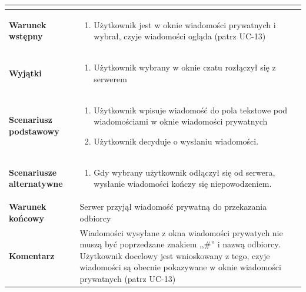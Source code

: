 \documentclass[11pt,oneside,a4paper,titlepage,onecolumn]{article}
\newenvironment{enumreq}
{ \begin{enumerate}[topsep=0pt,itemsep=-1ex,partopsep=1ex,parsep=1ex] }
{ \end{enumerate}                  }
\begin{document}
{\begin{tabular}{ | l | l | }
{		}\\
		
	\hline
		\parbox[t]{4cm}{\textbf{Warunek wstępny}} & \parbox[t]{11cm}{
			\begin{enumreq}
				\item Użytkownik jest w oknie wiadomości prywatnych i
				wybrał, czyje wiadomości ogląda (patrz UC-13)
			\end{enumreq}
				
		}
		\\
		
	\hline
		\parbox[t]{4cm}{\textbf{Wyjątki}} & \parbox[t]{11cm}{
			\begin{enumreq}
				\item Użytkownik wybrany w oknie czatu rozłączył się 
				z serwerem
			\end{enumreq}
		}
		\\

	\hline
		\parbox[t]{4cm}{\textbf{Scenariusz podstawowy}} & \parbox[t]{11cm}{
			\begin{enumreq}
				\item Użytkownik wpisuje wiadomość do pola tekstowe pod
				wiadomościami w oknie wiadomości prywatnych
				\item Użytkownik decyduje o wysłaniu wiadomości.
			\end{enumreq}
		}
		\\
		
	\hline
		\parbox[t]{4cm}{\textbf{Scenariusze alternatywne}} & \parbox[t]
		{11cm}{
			\begin{enumreq}
				\item Gdy wybrany użytkownik odłączył się od serwera,
				wysłanie wiadomości kończy się niepowodzeniem.
			\end{enumreq}
		}
		\\
		
	\hline
		\parbox[t]{4cm}{\textbf{Warunek końcowy}} & \parbox[t]{11cm}{
			Serwer przyjął wiadomość prywatną do przekazania odbiorcy
		}
		\\
		
	\hline
		\parbox[t]{4cm}{\textbf{Komentarz}} & \parbox[t]{11cm}{
			Wiadomości wysyłane z okna wiadomości prywatych nie muszą być
			poprzedzane znakiem ,,\#'' i nazwą odbiorcy. Użytkownik docelowy
			jest wnioskowany z tego, czyje wiadomości są obecnie pokazywane w
			oknie wiadomości prywatnych (patrz UC-13)
		}
		\\

	\hline
\end{tabular}

}
\end{document}
